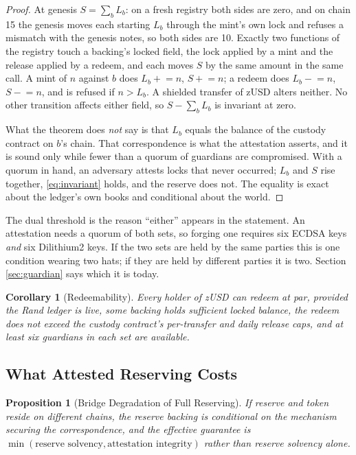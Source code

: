 \documentclass[11pt,a4paper]{article}
\newtheorem{proposition}[theorem]{Proposition}
\newtheorem{corollary}[theorem]{Corollary}
\begin{document}
\begin{proof}
At genesis $S = \sum_b L_b$: on a fresh registry both sides are zero, and on chain 15 the genesis moves each starting $L_b$ through the mint's own lock and refuses a mismatch with the genesis notes, so both sides are 10. Exactly two functions of the registry touch a backing's locked field, the lock applied by a mint and the release applied by a redeem, and each moves $S$ by the same amount in the same call. A mint of $n$ against $b$ does $L_b \mathrel{+}= n$, $S \mathrel{+}= n$; a redeem does $L_b \mathrel{-}= n$, $S \mathrel{-}= n$, and is refused if $n > L_b$. A shielded transfer of zUSD alters neither. No other transition affects either field, so $S - \sum_b L_b$ is invariant at zero.

What the theorem does \emph{not} say is that $L_b$ equals the balance of the custody contract on $b$'s chain. That correspondence is what the attestation asserts, and it is sound only while fewer than a quorum of guardians are compromised. With a quorum in hand, an adversary attests locks that never occurred; $L_b$ and $S$ rise together, \eqref{eq:invariant} holds, and the reserve does not. The equality is exact about the ledger's own books and conditional about the world.
\end{proof}

The dual threshold is the reason ``either'' appears in the statement. An attestation needs a quorum of both sets, so forging one requires six ECDSA keys \emph{and} six Dilithium2 keys. If the two sets are held by the same parties this is one condition wearing two hats; if they are held by different parties it is two. Section \ref{sec:guardian} says which it is today.

\begin{corollary}[Redeemability]
\label{cor:redeem}
Every holder of zUSD can redeem at par, provided the Rand ledger is live, some backing holds sufficient locked balance, the redeem does not exceed the custody contract's per-transfer and daily release caps, and at least six guardians in each set are available.
\end{corollary}

\subsection{What Attested Reserving Costs}
\label{sec:bridgecost}

\begin{proposition}[Bridge Degradation of Full Reserving]
\label{prop:bridge}
If reserve and token reside on different chains, the reserve backing is conditional on the mechanism securing the correspondence, and the effective guarantee is $\min(\text{reserve solvency}, \text{attestation integrity})$ rather than reserve solvency alone.
\end{proposition}
\end{document}
